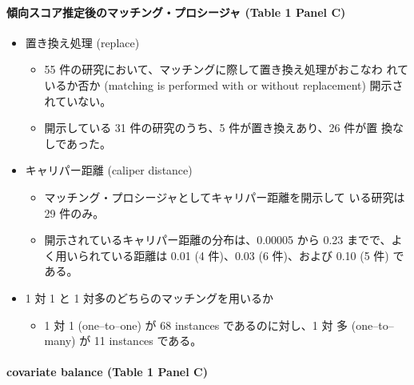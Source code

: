 \paragraph{傾向スコア推定後のマッチング・プロシージャ (Table 1 Panel C)}

\begin{itemize}
 \item 置き換え処理 (replace)
       \begin{itemize}
        \item 55 件の研究において、マッチングに際して置き換え処理がおこなわ
              れているか否か (matching is performed with or without
              replacement) 開示されていない。
        \item 開示している 31 件の研究のうち、5 件が置き換えあり、26 件が置
              換なしであった。
       \end{itemize}
 \item キャリパー距離 (caliper distance)
       \begin{itemize}
        \item マッチング・プロシージャとしてキャリパー距離を開示して
              いる研究は 29 件のみ。
        \item 開示されているキャリパー距離の分布は、0.00005 から
              0.23 までで、よく用いられている距離は 0.01 (4 件)、0.03 (6
              件)、および 0.10 (5 件) である。
       \end{itemize}
 \item 1 対 1 と 1 対多のどちらのマッチングを用いるか
       \begin{itemize}
        \item 1 対 1 (one--to--one) が 68 instances であるのに対し、1 対
              多 (one--to--many) が 11 instances である。
       \end{itemize}
\end{itemize}

\paragraph{covariate balance (Table 1 Panel C)}

